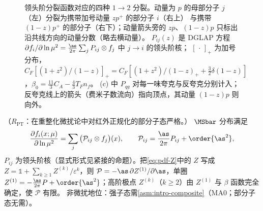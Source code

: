 \begin{figure}[htbp]
\caption{领头阶分裂函数对应的四种 $1\to2$ 分裂。动量为 $p$ 的母部分子 $j$（左）分裂为携带加号动量 $zp^+$ 的部分子 $i$（右上）
与携带 $(1-z)p^+$ 的部分子（右下）；动量箭头旁的 $zp$、$(1-z)p$ 只标出沿共线方向的动量分数（略去横动量）。
$P_{ij}(z)$ 是 DGLAP 方程 $\partial f_i/\partial\ln\mu^2=\frac{\as}{2\pi}\sum_jP_{ij}\otimes f_j$ 中 $j\to i$ 的领头阶核；
$[\,\cdot\,]_+$ 为加号分布，$C_F[(1+z^2)/(1-z)]_+=C_F[(1+z^2)/(1-z)_++\tfrac32\delta(1-z)]$，$\beta_0=\tfrac{11}{3}C_A-\tfrac43T_Fn_f$。
(c) 中 $P_{qg}$ 对每一味夸克与反夸克分别计入；反夸克线上的箭头（费米子数流向）指向顶点，其动量 $(1-z)p$ 则向外。}
\label{fig:splitting-vertices}
\end{figure}

\begin{theorem}\label{thm:pdf-dglap}
（$R_{\mathrm{PT}}$：在重整化微扰论中对红外正规化的部分子态严格。）
$\MSbar$ 分布满足
\begin{equation}\label{eq:pdf-dglap}
\frac{\partial f_i(x;\mu)}{\partial\ln\mu^2}=\sum_j\big(\mathcal P_{ij}\otimes f_j\big)(x),\qquad
\mathcal P_{ij}=\frac{\as}{2\pi}P_{ij}+\order{\as^2},
\end{equation}
$P_{ij}$ 为领头阶核（显式形式见紧接的命题）。把\cref{eq:pdf-Z}中的 $Z$ 写成 $Z=\mathbb 1+\sum_{k\ge1}Z^{(k)}/\varepsilon^k$，则 $\mathcal P=-\as\,\partial Z^{(1)}/\partial\as$，单圈 $Z^{(1)}=-\frac{\as}{2\pi}P+\order{\as^2}$；高阶极点 $Z^{(k)}$（$k\ge2$）由 $Z^{(1)}$ 与 $\beta$ 函数完全确定，使 $\mathcal P$ 有限。
非微扰地位：强子态需\cref{asm:intro-composite}（MA0；部分子态无需）。
\end{theorem}

